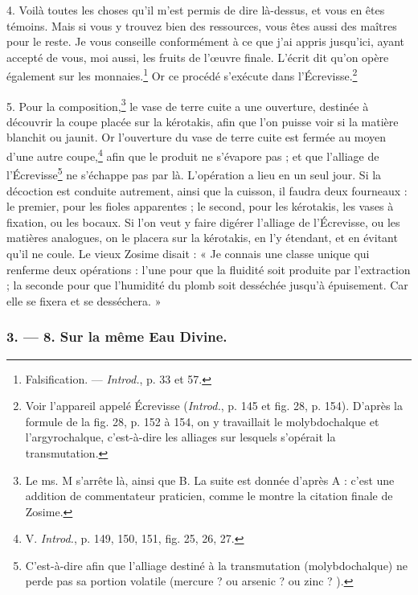 \documentclass[landscape, a4paper, 11pt, oneside, polutonikogreek, french]{article}
\begin{document}
4. Voilà toutes les choses qu'il m'est permis de dire là-dessus, et vous en êtes témoins. Mais si vous y trouvez bien des ressources, vous êtes aussi des maîtres pour le reste. Je vous conseille conformément à ce que j'ai appris jusqu'ici, ayant accepté de vous, moi aussi, les fruits de l'œuvre finale. L'écrit dit qu'on opère également sur les monnaies.\footnote{Falsification. --- \emph{Introd.}, p. 33 et 57.} Or ce procédé s'exécute dans l'Écrevisse.\footnote{Voir l'appareil appelé Écrevisse (\emph{Introd.}, p. 145 et fig. 28, p. 154). D'après la formule de la fig. 28, p. 152 à 154, on y travaillait le molybdochalque et l'argyrochalque, c'est-à-dire les alliages sur lesquels s'opérait la transmutation.}

5. Pour la composition,\footnote{Le ms. M s'arrête là, ainsi que B. La suite est donnée d'après A : c'est une addition de commentateur praticien, comme le montre la citation finale de Zosime.} le vase de terre cuite a une ouverture, destinée à découvrir la coupe placée sur la kérotakis, afin que l'on puisse voir si la matière blanchit ou jaunit. Or l'ouverture du vase de terre cuite est fermée au moyen d'une autre coupe,\footnote{V. \emph{Introd.}, p. 149, 150, 151, fig. 25, 26, 27.} afin que le produit ne s'évapore pas ; et que l'alliage de l'Écrevisse\footnote{C'est-à-dire afin que l'alliage destiné à la transmutation (molybdochalque) ne perde pas sa portion volatile (mercure ? ou arsenic ? ou zinc ? ).} ne s'échappe pas par là. L'opération a lieu en un seul jour. Si la décoction est conduite autrement, ainsi que la cuisson, il faudra deux fourneaux : le premier, pour les fioles apparentes ; le second, pour les kérotakis, les vases à fixation, ou les bocaux. Si l'on veut y faire digérer l'alliage de l'Écrevisse, ou les matières analogues, on le placera sur la kérotakis, en l'y étendant, et en évitant qu'il ne coule. Le vieux Zosime disait : « Je connais une classe unique qui renferme deux opérations : l'une pour que la fluidité soit produite par l'extraction ; la seconde pour que l'humidité du plomb soit desséchée jusqu'à épuisement. Car elle se fixera et se desséchera. »

\bigskip
\centerline{\EightStarTaper}
\centerline{\EightStarTaper\EightStarTaper}
\bigskip

\subsubsection{3. --- 8. Sur la même Eau Divine.}
\end{document}
